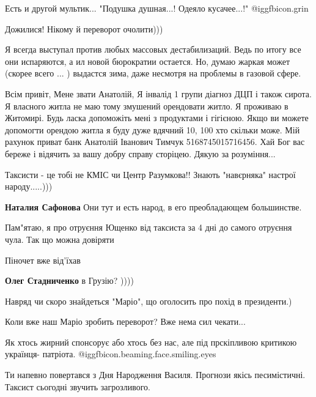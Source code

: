 \begin{itemize}
Есть и другой мультик...
"Подушка душная...!
Одеяло кусачее...!"
 @igg{fbicon.grin} 

Дожилися! Нікому й переворот очолити)))


Я всегда выступал против любых массовых дестабилизаций. Ведь по итогу все они
испаряются, а ил новой бюрократии остается.  Но, думаю жаркая может (скорее
всего ... ) выдастся зима, даже несмотря на проблемы в газовой сфере.


Всім привіт, Мене звати Анатолій, Я інвалід 1 групи діагноз ДЦП і також сирота.
Я власного житла не маю тому змушений орендовати житло. Я проживаю в Житомирі.
Будь ласка допоможіть мені з продуктами і гігієною. Якщо ви можете допомогти
орендою житла я буду дуже вдячний 10, 100 хто скільки може. Мій рахунок приват
банк Анатолій Іванович Тимчук 5168745015716456. Хай Бог вас береже і відячить
за вашу добру справу сторіцею. Дякую за розуміння...


Таксисти - це тобі не КМІС чи Центр Разумкова!! Знають "навєрняка" настрої
народу.....)))

\begin{itemize} %
\textbf{Наталия Сафонова} Они тут и есть народ, в его преобладающем большинстве.
\end{itemize} %


Пам"ятаю, я про отруєння Ющенко від таксиста за 4 дні до самого отруєння чула. Так що можна довіряти

Піночет вже від’їхав

\begin{itemize} %
\textbf{Олег Стадниченко} в Грузію? ))))
\end{itemize} %

Навряд чи скоро знайдеться "Маріо", що оголосить про похід в президенти.)

Коли вже наш Маріо зробить переворот? Вже нема сил чекати...

Як хтось жирний спонсорує або хтось без нас, але під прскіпливою критикою українця- патріота. @igg{fbicon.beaming.face.smiling.eyes} 

Ти напевно повертався з Дня Народження Василя. Прогнози якісь песимістичні. Таксист сьогодні звучить загрозливого.


\end{itemize}
